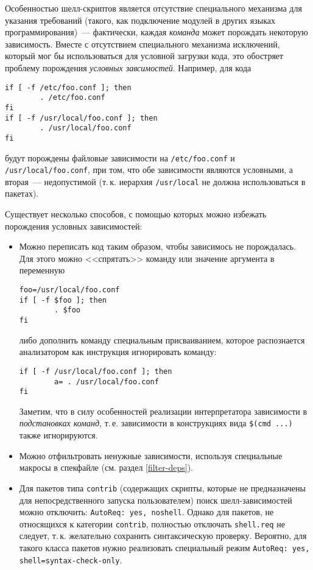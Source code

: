 \documentclass[russian,a4paper,12pt,titlepage]{article}
\begin{document}
Особенностью шелл-скриптов является отсутствие специального механизма для указания требований (такого, как подключение
модулей в других языках программирования)~--- фактически, каждая \textit{команда} может порождать некоторую зависимость.
Вместе с отсутствием специального механизма исключений, который мог бы использоваться для условной загрузки кода,
это обостряет проблему порождения \textit{условных завсимостей}.  Например, для кода
\begin{verbatim}
if [ -f /etc/foo.conf ]; then
        . /etc/foo.conf
fi
if [ -f /usr/local/foo.conf ]; then
        . /usr/local/foo.conf
fi
\end{verbatim}
будут порождены файловые зависимости на \verb|/etc/foo.conf| и \verb|/usr/local/foo.conf|, при том,
что обе зависимости являются условными, а вторая~--- недопустимой (т.\,к. иерархия \verb|/usr/local|
не должна использоваться в пакетах).

Существует несколько способов, с помощью которых можно избежать порождения условных зависимостей:
\begin{itemize}
\item Можно переписать код таким образом, чтобы зависимось не порождалась.
Для этого можно <<спрятать>> команду или значение аргумента в переменную
\begin{verbatim}
foo=/usr/local/foo.conf
if [ -f $foo ]; then
        . $foo
fi
\end{verbatim}
либо дополнить команду специальным присваиванием, которое распознается анализатором
как инструкция игнорировать команду:
\begin{verbatim}
if [ -f /usr/local/foo.conf ]; then
        a= . /usr/local/foo.conf
fi
\end{verbatim}
Заметим, что в силу особенностей реализации интерпретатора зависимости в \textit{подстановках команд},
т.\,е. зависимости в конструкциях вида \verb|$(cmd ...)| также игнорируются.
\item Можно отфильтровать ненужные зависимости, используя специальные макросы в спекфайле
(см. раздел \ref{filter-deps}).
\item Для пакетов типа \verb|contrib| (содержащих скрипты, которые не предназначены для
непосредственного запуска пользователем) поиск шелл-зависимостей можно отключить:
\texttt{AutoReq: yes, noshell}.  Однако для пакетов, не относящихся к категории \verb|contrib|,
полностью отключать \verb|shell.req| не следует, т.\,к. желательно сохранить синтаксическую
проверку.  Вероятно, для такого класса пакетов нужно реализовать специальный режим
\texttt{AutoReq: yes, shell=syntax-check-only}.
\end{itemize}
\end{document}
